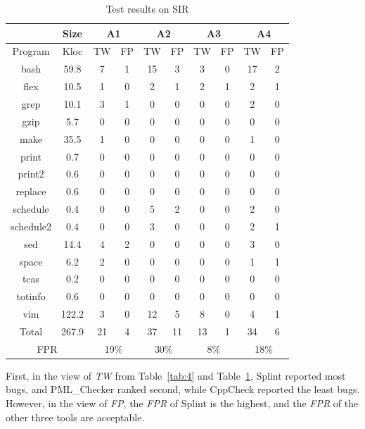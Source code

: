 \begin{table}[!t]
\caption{Test results on SIR}\label{tab:5}
\raggedleft
\hspace{-0.5cm}\begin{tabular}{|c|c|c|c|c|c|c|c|c|c|}
\hline
& \textbf{Size} & \multicolumn{2}{|c|}{\textbf{A1}} & \multicolumn{2}{|c|}{\textbf{A2}} & \multicolumn{2}{|c|}{\textbf{A3}} & \multicolumn{2}{|c|}{\textbf{A4}}\\
\hline
Program & Kloc & TW & FP & TW & FP & TW & FP & TW & FP\\
\hline
bash       & 59.8 &7	&1	  & 15  & 3  & 3	 & 0   & 17  & 2\\
\hline
flex	       & 10.5  & 1	& 0	  & 2    & 1  & 2	 & 1	   & 2   & 1\\
\hline
grep	 & 10.1 & 3	& 1	  & 0    & 0  & 0	 & 0	   & 2   & 0\\
\hline
gzip	       & 5.7   & 0	& 0	  & 0    & 0  & 0	 & 0	   & 0   & 0\\
\hline
make	 & 35.5 &1	& 0	  & 0    & 0  & 0	 & 0	   & 1   & 0\\
\hline
print	 & 0.7   &  0	& 0	  & 0    & 0  & 0	 & 0	   & 0   & 0\\
\hline
print2	 & 0.6   & 0	& 0	  & 0    & 0  & 0	 & 0   &	0   & 0\\
\hline
replace    & 0.6   & 0	& 0	  & 0    & 0  & 0	 & 0	   & 0   & 0\\
\hline
schedule  & 0.4	& 0	& 0	  & 5    & 2  & 0	 & 0	   & 2   & 0\\
\hline
schedule2 & 0.4	& 0	& 0    & 3    & 0  & 0	 & 0	   & 2   & 1\\
\hline
sed	        & 14.4	& 4	& 2    &	0   & 0  & 0	 & 0	   & 3   & 0\\
\hline
space	 & 6.2	& 2	& 0	   & 0   & 0  & 0	 & 0	   & 1   & 1\\
\hline
tcas	       & 0.2	& 0	& 0    &	0   & 0  & 0	 & 0    & 0   & 0\\
\hline
totinfo	 & 0.6	& 0  & 0	   & 0    & 0  & 0	 & 0	   & 0   & 0\\
\hline
vim        & 122.2	& 3	& 0	   & 12  & 5  & 8	 & 0	   & 4   & 1\\
\hline
Total	 & 267.9	 & 21&4	   & 37  & 11 & 13 & 1   & 34  & 6\\
\hline
\multicolumn{2}{|c|}{FPR} & \multicolumn{2}{|c|}{19\%} & \multicolumn{2}{|c|}{30\%} & \multicolumn{2}{|c|}{8\%} & \multicolumn{2}{|c|}{18\%}\\
\hline
\end{tabular}
\end{table}
First, in the view of \textit{TW} from Table~\ref{tab:4} and Table~\ref{tab:5}, Splint reported most bugs, and PML\_Checker ranked second, while CppCheck reported the least bugs. However, in the view of \textit{FP}, the \textit{FPR} of Splint is the highest, and the \textit{FPR} of the other three tools are acceptable.

